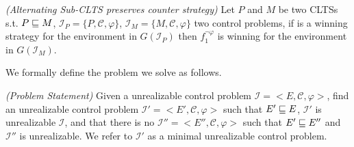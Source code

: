 \begin{lemma}\emph{(Alternating Sub-CLTS preserves counter strategy)}\label{theorem:theo.preserves-non-realizability}
Let $P$ and $M$ be two CLTSs s.t. $P \sqsubseteq M$, 
$\mathcal{I}_P = \lbrace P, \mathcal{C}, \varphi \rbrace$,
$\mathcal{I}_M = \lbrace M, \mathcal{C}, \varphi \rbrace$
two control problems, if
 \counterS is a winning strategy for
the environment in $G(\mathcal{I}_P)$ 
then $f_1^{\neg \varphi}$ is winning for the environment in
$G(\mathcal{I}_M)$.
\end{lemma}


%

We formally define the problem we solve as follows.

\begin{definition}\label{def:ProblemStatement}\emph{(Problem Statement)}
Given a unrealizable control problem $\mathcal{I} = <E, \mathcal{C}, \varphi>$, find an unrealizable control problem $\mathcal{I'} = <E', \mathcal{C}, \varphi>$ such that $E' \sqsubseteq E$, $\mathcal{I'}$ is unrealizable $\mathcal{I}$, and that there is no $\mathcal{I''} = <E'', \mathcal{C}, \varphi>$ such that $E' \sqsubseteq E''$ and $\mathcal{I''}$ is unrealizable. We refer to $\mathcal{I'}$ as a minimal unrealizable control problem.
\end{definition}

